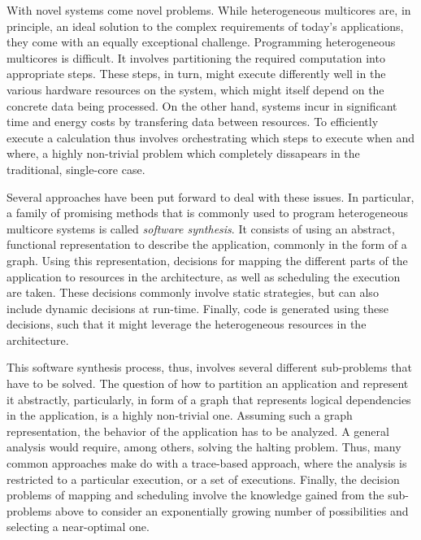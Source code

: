 \documentclass{article}
\begin{document}
With novel systems come novel problems. While heterogeneous multicores are, in principle, an ideal solution to the complex requirements of today's applications, they come with an equally exceptional challenge.
Programming heterogeneous multicores is difficult. It involves partitioning the required computation into appropriate steps. These steps, in turn, might execute differently well in the various hardware resources on the system,
which might itself depend on the concrete data being processed.
On the other hand, systems incur in significant time and energy costs by transfering data between resources.
To efficiently execute a calculation thus involves orchestrating which steps to execute when and where, a highly non-trivial problem which completely dissapears in the traditional, single-core case.

Several approaches have been put forward to deal with these issues.
In particular, a family of promising methods that is commonly used to program heterogeneous multicore systems is called \emph{software synthesis}\cite{bhattacharyya2012software,sgroi1999synthesis}.
It consists of using an abstract, functional representation to describe the application, commonly in the form of a graph. Using this representation,
decisions for mapping the different parts of the application to resources in the architecture, as well as scheduling the execution are taken. These decisions commonly involve static strategies,
but can also include dynamic decisions at run-time. Finally, code is generated using these decisions, such that it might leverage the heterogeneous resources in the architecture.

This software synthesis process, thus, involves several different sub-problems that have to be solved.
The question of how to partition an application and represent it abstractly, particularly, in form of a graph that represents logical dependencies in the application, is a highly non-trivial one.
Assuming such a graph representation, the behavior of the application has to be analyzed.
A general analysis would require, among others, solving the halting problem.
Thus, many common approaches make do with a trace-based approach, where the analysis is restricted to a particular execution, or a set of executions.
Finally, the decision problems of mapping and scheduling involve the knowledge gained from the sub-problems above to consider an exponentially growing number of possibilities and selecting a near-optimal one.
\end{document}

